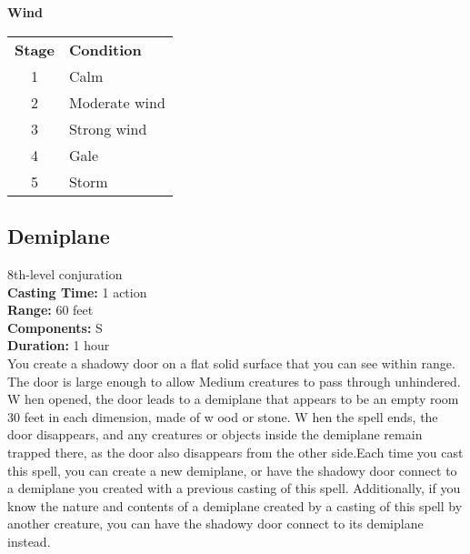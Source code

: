 \documentclass[11pt, A4paper, english]{article}
\begin{document}
 \\
 \\
\Large \textbf{Wind} \\
			\begin{tabular}{cl}
\textbf{Stage} & \textbf{Condition} \\
1 & Calm \\
2 & Moderate wind \\
3 & Strong wind \\
4 & Gale \\
5 & Storm
			\end{tabular}

		\subsection{Demiplane}
8th-level conjuration \\
\textbf{Casting Time:} 1 action \\
\textbf{Range:} 60 feet \\
\textbf{Components:} S \\
\textbf{Duration:} 1 hour \\
You create a shadowy door on a flat solid surface that you can see within range. The door is large enough to allow Medium creatures to pass through unhindered. W hen opened, the door leads to a demiplane that appears to be an empty room  30 feet in each dimension, made of w ood or stone. W hen the spell ends, the door disappears, and any creatures or objects inside the demiplane remain trapped there, as the door also disappears from the other side.Each time you cast this spell, you can create a new demiplane, or have the shadowy door connect to a demiplane you created with a previous casting of this spell. Additionally, if you know the nature and contents of a demiplane created by a casting of this spell by another creature, you can have the shadowy door connect to its demiplane instead.
\end{document}
